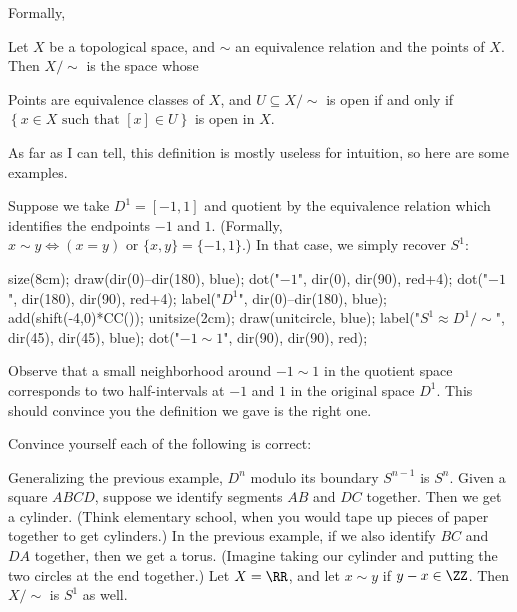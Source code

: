 \documentclass[11pt]{scrreprt}
\begin{document}
Formally,
\begin{definition}
	Let $X$ be a topological space, and $\sim$ an equivalence relation
	and the points of $X$.
	Then $X / {\sim}$ is the space whose
	\begin{itemize}
		\ii Points are equivalence classes of $X$, and
		\ii $U \subseteq X / {\sim}$ is open if and only if
		$\left\{ x \in X \text{ such that } [x] \in U  \right\}$
		is open in $X$.
	\end{itemize}
\end{definition}
As far as I can tell, this definition is mostly useless for intuition,
so here are some examples.

\begin{example}
	Suppose we take $D^1 = [-1, 1]$
	and quotient by the equivalence relation which identifies
	the endpoints $-1$ and $1$.
	(Formally, $x \sim y \iff (x=y) \text{ or } \{x,y\} = \{-1,1\}$.)
	In that case, we simply recover $S^1$:
	\begin{center}
		\begin{asy}
			size(8cm);
			draw(dir(0)--dir(180), blue);
			dot("$-1$", dir(0), dir(90), red+4);
			dot("$-1$", dir(180), dir(90), red+4);
			label("$D^1$", dir(0)--dir(180), blue);
			add(shift(-4,0)*CC());
			unitsize(2cm);
			draw(unitcircle, blue);
			label("$S^1 \approx D^1 / {\sim}$", dir(45), dir(45), blue);
			dot("$-1 \sim 1$", dir(90), dir(90), red);
		\end{asy}
	\end{center}
	Observe that a small neighborhood around $-1 \sim 1$ in the quotient space
	corresponds to two half-intervals at $-1$ and $1$ in the original space $D^1$.
	This should convince you the definition we gave is the right one.
\end{example}

\begin{example}
	Convince yourself each of the following is correct:
	\begin{itemize}
		\ii Generalizing the previous example, $D^n$ modulo its boundary $S^{n-1}$ is $S^n$.
		\ii Given a square $ABCD$, suppose we identify segments $AB$ and $DC$ together.
		Then we get a cylinder. (Think elementary school, when you would tape
		up pieces of paper together to get cylinders.)
		\ii In the previous example, if we also identify $BC$ and $DA$ together,
		then we get a torus. (Imagine taking our cylinder and putting the two
		circles at the end together.)
		\ii Let $X = \RR$, and let $x \sim y$ if $y -x \in \ZZ$.
		Then $X / {\sim}$ is $S^1$ as well.
	\end{itemize}
\end{example}
\end{document}
